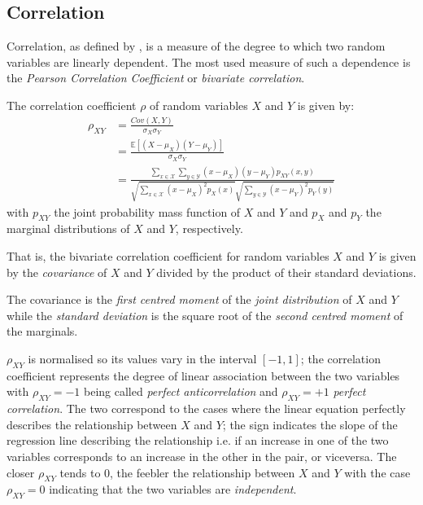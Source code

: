 \subsection{Correlation} \label{subsec:correlation}
Correlation, as defined by \cite{Stolp2006}, is a measure of the degree to which two random variables are linearly dependent.
The most used measure of such a dependence is the \textit{Pearson Correlation Coefficient} or \textit{bivariate correlation}.
\begin{definition}
	The correlation coefficient $\rho$ of random variables $X$ and $Y$ is given by:
	\begin{align} \label{eq:correlation}
		\rho_{XY} &= \frac{Cov(X,Y)}{\sigma_X \sigma_Y} \\
		&= \frac{\mathbb{E}[ (X - \mu_X) (Y - \mu_Y) ]}{\sigma_X \sigma_Y} \\
		&= \frac{\sum_{x \in \mathcal{X}} \sum_{y \in \mathcal{Y}} (x - \mu_X) (y - \mu_Y) p_{XY}(x,y)}{ \sqrt{\sum_{x \in \mathcal{X}}  (x - \mu_X)^2 p_X(x)} \sqrt{\sum_{y \in \mathcal{Y}} (x - \mu_Y)^2 p_Y(y)} } 
	\end{align}
	with $p_{XY}$ the joint probability mass function of $X$ and $Y$ and $p_{X}$ and $p_{Y}$ the marginal distributions of $X$ and $Y$, respectively.
\end{definition}
That is, the bivariate correlation coefficient for random variables $X$ and $Y$ is given by the \textit{covariance} of $X$ and $Y$ divided by the product of their standard deviations.

The covariance is the \textit{first centred moment} of the \textit{joint distribution} of $X$ and $Y$ while the \textit{standard deviation} is the square root of the \textit{second centred moment} of the marginals.

$\rho_{XY}$ is normalised so its values vary in the interval $[-1,1]$; the correlation coefficient represents the degree of linear association between the two variables with $\rho_{XY}=-1$ being called \textit{perfect anticorrelation} and $\rho_{XY}=+1$ \textit{perfect correlation}.
The two correspond to the cases where the linear equation perfectly describes the relationship between $X$ and $Y$; the sign indicates the slope of the regression line describing the relationship i.e. if an increase in one of the two variables corresponds to an increase in the other in the pair, or viceversa.
The closer $\rho_{XY}$ tends to $0$, the feebler the relationship between $X$ and $Y$ with the case $\rho_{XY}=0$ indicating that the two variables are \textit{independent}.
